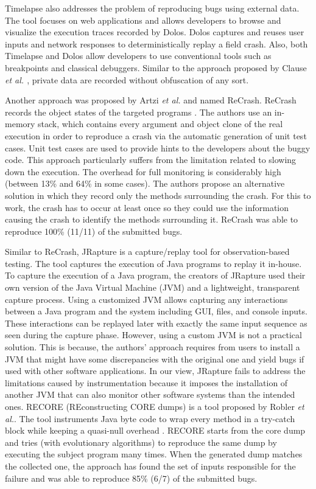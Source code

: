 Timelapse \cite{Burg2013} also addresses the problem of reproducing bugs using external data.
The tool focuses on web applications and allows developers to browse and visualize the execution traces recorded by Dolos. Dolos captures and reuses user inputs and network responses to deterministically replay a field crash.
Also, both Timelapse and Dolos allow developers to use conventional tools such as breakpoints and classical debuggers. Similar to the approach proposed by Clause {\it et al. \cite{Clause2007}}, private data are recorded without obfuscation of any sort.

Another approach was proposed by Artzi {\it et al.} and named ReCrash.
ReCrash records the object states of the targeted programs \cite{Artzi2008}.
The authors use an in-memory stack, which contains every argument and object clone of the real execution in order to reproduce a crash via the automatic generation of unit test cases.
Unit test cases are used to provide hints to the developers about the buggy code.
This approach particularly suffers from the limitation related to slowing down the execution.
The overhead for full monitoring is considerably high (between 13\% and 64\% in some cases).
The authors  propose an alternative solution in which they record only the methods surrounding the crash.
For this to work, the crash has to occur at least once so they could use the information causing the crash to identify the methods surrounding it.
ReCrash was able to reproduce 100\% (11/11) of the submitted bugs.

Similar to ReCrash, JRapture \cite{Steven2000} is a capture/replay tool for observation-based testing.
The tool captures the execution of Java programs to replay it in-house.
To capture the execution of a Java program, the creators of JRapture used their own version of the Java Virtual Machine (JVM) and a lightweight, transparent capture process.
Using a customized JVM allows capturing any interactions between a Java program and the system including GUI, files, and console inputs.
These interactions can be replayed later  with exactly the same input sequence as seen during the capture phase.
However, using a custom JVM is not a practical solution.
This is because, the authors' approach requires from users to install a JVM that might have some discrepancies with the original one and yield bugs if used with other software applications.
In our view,  JRapture fails to address the limitations caused by instrumentation because it imposes the installation of another JVM that can also monitor other software systems than the intended ones.
RECORE (REconstructing CORE dumps) is a tool proposed by Robler {\it et al.}.
The tool instruments Java byte code to wrap every method in a try-catch block while keeping a quasi-null overhead \cite{Rossler2013}.
RECORE starts from the core dump and tries (with evolutionary algorithms) to reproduce the same dump by executing the subject program many times.
When the generated dump matches the collected one, the approach has found the set of inputs responsible for the failure and was able to reproduce 85\% (6/7) of the submitted bugs.

